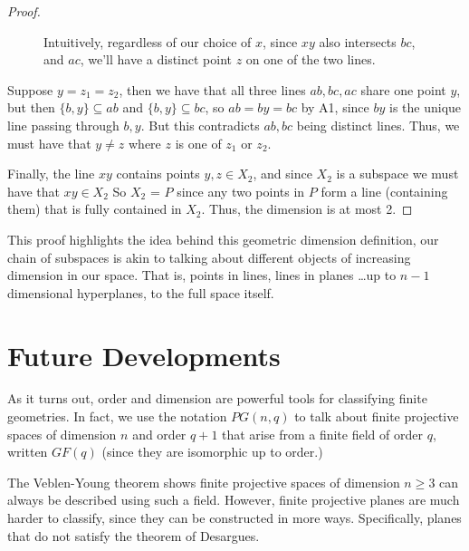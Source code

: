 \documentclass[12pt]{article}
\begin{document}
\begin{proof}
\begin{figure}[h]
            \caption{Intuitively, regardless of our choice of $x$, since $xy$ also intersects $bc$, and $ac$, we'll have a distinct point $z$ on one of the two lines.}
        \end{figure}

        Suppose $y = z_1 = z_2$, then we have that all three lines $ab,bc,ac$ share one point $y$,
        but then $\{b, y\} \subseteq ab$ and $\{b, y\} \subseteq bc$, so $ab = by = bc$ by A1,
        since $by$ is the unique line passing through $b, y$.
        But this contradicts $ab, bc$ being distinct lines.
        Thus, we must have that $y \neq z$ where $z$ is one of $z_1$ or $z_2$.

        Finally, the line $xy$ contains points $y,z \in X_2$, and since $X_2$ is a subspace we must have that $xy \in X_2$
        So $X_2$ = $P$ since any two points in $P$ form a line (containing them) that is fully contained in $X_2$.
        Thus, the dimension is at most 2.
    \end{proof}

    This proof highlights the idea behind this geometric dimension definition,
    our chain of subspaces is akin to talking about different objects of increasing dimension in our space.
    That is, points in lines, lines in planes \ldots up to $n-1$ dimensional hyperplanes, to the full space itself.

    \section{Future Developments}

    As it turns out, order and dimension are powerful tools for classifying finite geometries.
    In fact, we use the notation $PG(n, q)$ to talk about finite projective spaces of dimension $n$ and order $q+1$
    that arise from a finite field of order $q$, written $GF(q)$ (since they are isomorphic up to order.)\cite[p.~xv]{hirschfeld_general_2016}

    The Veblen-Young theorem shows finite projective spaces of dimension $n \geq 3$ can always be described using such a field.
    However, finite projective planes are much harder to classify, since they can be constructed in more ways.
    Specifically, planes that do not satisfy the theorem of Desargues.\cite[\S3]{beutelspacher_projective_1998}
\end{document}
